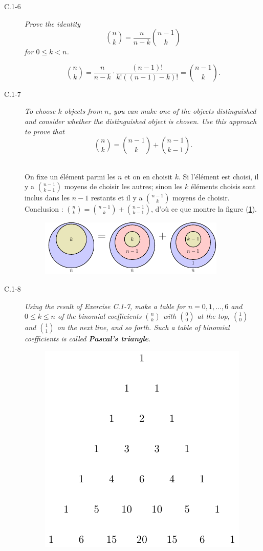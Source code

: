 \begin{description}
  \item[C.1-6] {\itshape Prove the identity \[\binom{n}{k} = \frac{n}{n-k}\binom{n-1}{k}\] for $ 0 \le k < n$.}
    \begin{ex}
      \[ \binom{n}{k} = \frac{n}{n-k}\cdot\frac{(n-1)!}{k!((n-1)-k)!} = \binom{n-1}{k}.\]
    \end{ex}
  \item[C.1-7] {\itshape To choose $k$ objects from $n$, you can make one of the objects distinguished and consider whether the distinguished object is chosen. Use this approach to prove that \[\binom{n}{k} = \binom{n-1}{k}+\binom{n-1}{k-1}.\]}
    \begin{ex}\mbox{}\\ %
      On fixe un \'el\'ement parmi les $n$ et on en choisit $k$. Si l'\'el\'ement est choisi, il y a $\binom{n-1}{k-1}$ moyens de choisir les autres; sinon les $k$ \'el\'ements choisis sont inclus dans les $n-1$ restants et il y a $\binom{n-1}{k}$ moyens de choisir.
    Conclusion : $ \binom{n}{k} = \binom{n-1}{k}+\binom{n-1}{k-1}$, d'o\`u ce que montre la figure (\ref{fig:C.1-7}).     
      {
        \begin{figure}[H]
          \centering
        \includegraphics[scale=1.5]{img/C_1-7/C_1-7.pdf}
        \caption{}
          \label{fig:C.1-7}
        \end{figure}
      }
    \end{ex}
  \item[C.1-8] {\itshape Using the result of Exercise C.1-7, make a table for $n = 0, 1, \ldots, 6$ and $ 0\le k \le n$ of the binomial coefficients $\binom{n}{k}$ with $\binom{0}{0}$ at the top, $\binom{1}{0}$ and $\binom{1}{1}$ on the next line, and so forth. Such a table of binomial coefficients is called \textbf{Pascal’s triangle}.}
    \begin{ex}\mbox{}
      \begin{figure}[H]
        \centering
        \includegraphics{img/C_1-8/C_1-8.pdf}

\end{figure}
\end{ex}
\end{description}
